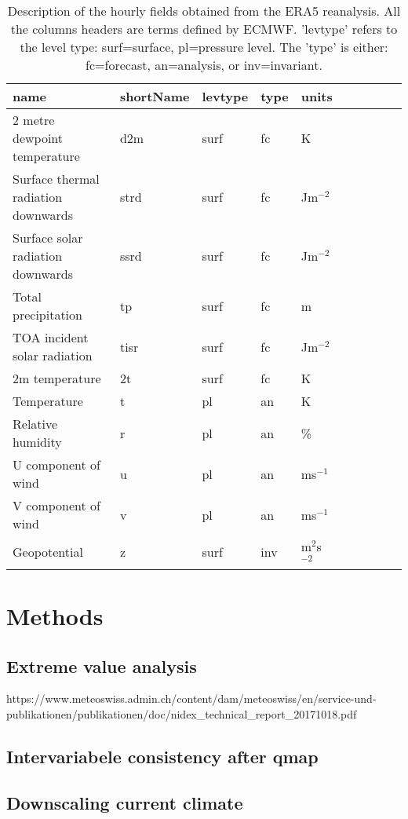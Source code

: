 \documentclass[hess, manuscript]{copernicus}
\begin{document}
\begin{table}[t]
 \begin{center}
 \caption{Description of the hourly fields obtained from the ERA5 reanalysis. All the columns headers are terms defined by ECMWF. 'levtype' refers to the level type: surf=surface, pl=pressure level. The 'type' is either: fc=forecast, an=analysis, or inv=invariant.}
 \begin{tabular}{l l l l l l l l l l}
 \hline
 name & shortName & levtype & type & units  \\
 \hline
 2 metre dewpoint temperature & d2m & surf & fc & K \\
 Surface thermal radiation downwards & strd & surf & fc & Jm$^{-2}$ \\
 Surface solar radiation downwards & ssrd & surf & fc & Jm$^{-2}$ \\
 Total precipitation & tp & surf & fc & m \\
 TOA incident solar radiation & tisr & surf & fc & Jm$^{-2}$ \\
 2m temperature & 2t & surf & fc & K \\
 Temperature & t & pl & an & K \\
 Relative humidity & r & pl & an & \% \\
 U component of wind & u & pl & an & ms$^{-1}$ \\
 V component of wind & v & pl & an & ms$^{-1}$ \\
 Geopotential & z & surf & inv & m$^2$s$^{-2}$ \\
 \hline  
 \end{tabular}
 \label{tab:01}
 \end{center}
\end{table}


\section{Methods}

\subsection{Extreme value analysis}
https://www.meteoswiss.admin.ch/content/dam/meteoswiss/en/service-und-publikationen/publikationen/doc/nidex_technical_report_20171018.pdf
\subsection{Intervariabele consistency after qmap}
\subsection{Downscaling current climate}
\end{document}
